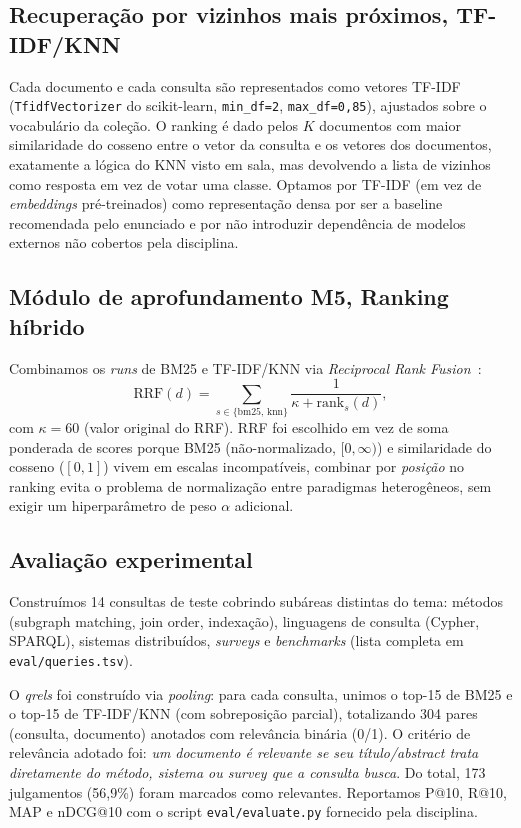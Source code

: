 \documentclass[12pt]{article}
\begin{document}
\subsection{Recuperação por vizinhos mais próximos, TF-IDF/KNN}

Cada documento e cada consulta são representados como vetores TF-IDF
(\texttt{TfidfVectorizer} do scikit-learn, \texttt{min\_df=2},
\texttt{max\_df=0{,}85}), ajustados sobre o vocabulário da coleção. O
ranking é dado pelos $K$ documentos com maior similaridade do cosseno entre
o vetor da consulta e os vetores dos documentos, exatamente a lógica do
KNN visto em sala, mas devolvendo a lista de vizinhos como resposta em vez
de votar uma classe. Optamos por TF-IDF (em vez de \textit{embeddings}
pré-treinados) como representação densa por ser a baseline recomendada pelo
enunciado e por não introduzir dependência de modelos externos não cobertos
pela disciplina.

\subsection{Módulo de aprofundamento M5, Ranking híbrido}

Combinamos os \textit{runs} de BM25 e TF-IDF/KNN via \textit{Reciprocal Rank
Fusion}~\cite{cormack2009rrf}:
\begin{equation}
\text{RRF}(d) = \sum_{s \in \{\text{bm25},\,\text{knn}\}} \frac{1}{\kappa + \text{rank}_s(d)},
\end{equation}
com $\kappa=60$ (valor original do RRF). RRF foi escolhido em vez de soma
ponderada de scores porque BM25 (não-normalizado, $[0,\infty)$) e
similaridade do cosseno ($[0,1]$) vivem em escalas incompatíveis,
combinar por \textit{posição} no ranking evita o problema de normalização
entre paradigmas heterogêneos, sem exigir um hiperparâmetro de peso $\alpha$
adicional.

\subsection{Avaliação experimental}
\label{sec:avaliacao}

Construímos 14 consultas de teste cobrindo subáreas distintas do tema:
métodos (subgraph matching, join order, indexação), linguagens de consulta
(Cypher, SPARQL), sistemas distribuídos, \textit{surveys} e \textit{benchmarks}
(lista completa em \texttt{eval/queries.tsv}).

O \textit{qrels} foi construído via \textit{pooling}: para cada consulta,
unimos o top-15 de BM25 e o top-15 de TF-IDF/KNN (com sobreposição
parcial), totalizando 304 pares (consulta, documento) anotados com
relevância binária (0/1). O critério de relevância adotado foi: \emph{um
documento é relevante se seu título/abstract trata diretamente do método,
sistema ou \textit{survey} que a consulta busca}. Do total, 173 julgamentos
(56,9\%) foram marcados como relevantes. Reportamos P@10, R@10, MAP e
nDCG@10 com o script \texttt{eval/evaluate.py} fornecido pela disciplina.
\end{document}
